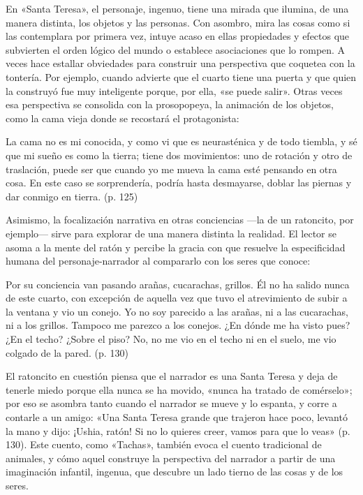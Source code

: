 \documentclass[14pt,twoside,final]{extbook} %
\begin{document}
En «Santa Teresa», el personaje, ingenuo, tiene una mirada que ilumina, de una manera distinta, los objetos y las personas. Con asombro, mira las cosas como si las contemplara por primera vez, intuye acaso en ellas propiedades y efectos que subvierten el orden lógico del mundo o establece asociaciones que lo rompen. A veces hace estallar obviedades para construir una perspectiva que coquetea con la tontería. Por ejemplo, cuando advierte que el cuarto tiene una puerta y que quien la construyó fue muy inteligente porque, por ella, «se puede salir». Otras veces esa perspectiva se consolida con la prosopopeya, la animación de los objetos, como la cama vieja donde se recostará el protagonista:\protect\enlargethispage*{\baselineskip}
\begin{quoting}
La cama no es mi conocida, y como vi que es neurasténica y de todo tiembla, y sé que mi sueño es como la tierra; tiene dos movimientos: uno de rotación y otro de traslación, puede ser que cuando yo me mueva la cama esté pensando en otra cosa. En este caso se sorprendería, podría hasta desmayarse, doblar las piernas y dar conmigo en tierra. (p. 125)
\end{quoting}
Asimismo, la focalización narrativa en otras conciencias ---la de un ratoncito, por ejemplo--- sirve para explorar de una manera distinta la realidad. El lector se asoma a la mente del ratón y percibe la gracia con que resuelve la especificidad humana del personaje-narrador al compararlo con los seres que conoce:
\begin{quoting}
Por su conciencia van pasando arañas, cucarachas, grillos. Él no ha salido nunca de este cuarto, con excepción de aquella vez que tuvo el atrevimiento de subir a la ventana y vio un conejo. Yo no soy parecido a las arañas, ni a las cucarachas, ni a los grillos. Tampoco me parezco a los conejos. ¿En dónde me ha visto pues? ¿En el techo? ¿Sobre el piso? No, no me vio en el techo ni en el suelo, me vio colgado de la pared. (p. 130)
\end{quoting}
El ratoncito en cuestión piensa que el narrador es una Santa Teresa y deja de tenerle miedo porque ella nunca se ha movido, «nunca ha tratado de comérselo»; por eso se asombra tanto cuando el narrador se mueve y lo espanta, y corre a contarle a un amigo: «Una Santa Teresa grande que trajeron hace poco, levantó la mano y dijo: ¡Ushia, ratón! Si no lo quieres creer, vamos para que lo veas» (p. 130). Este cuento, como «Tachas», también evoca el cuento tradicional de animales, y cómo aquel construye la perspectiva del narrador a partir de una imaginación infantil, ingenua, que descubre un lado tierno de las cosas y de los seres.
\end{document}
